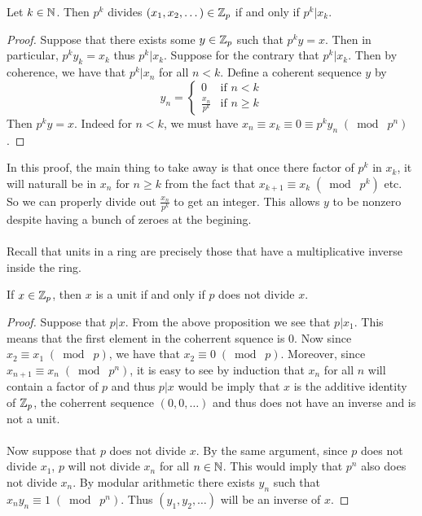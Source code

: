 \documentclass[a4paper]{article}
\begin{document}
\begin{prp}{}{} Let $k\in\mathbb{N}$. Then $p^k$ divides $(x_1,x_2,\dots)\in\mathbb{Z}_p$ if and only if $p^k|x_k$. \tcbline
\begin{proof}
Suppose that there exists some $y\in\mathbb{Z}_p$ such that $p^ky=x$. Then in particular, $p^ky_k=x_k$ thus $p^k|x_k$. Suppose for the contrary that $p^k|x_k$. Then by coherence, we have that $p^k|x_n$ for all $n<k$. Define a coherent sequence $y$ by $$y_n=\begin{cases}
0 & \text{if }n<k\\
\frac{x_n}{p^k} & \text{if }n\geq k
\end{cases}$$
Then $p^ky=x$. Indeed for $n<k$, we must have $x_n\equiv x_k\equiv 0\equiv p^ky_n\;(\bmod\;p^n)$. 
\end{proof}
\end{prp}

In this proof, the main thing to take away is that once there factor of $p^k$ in $x_k$, it will naturall be in $x_n$ for $n\geq k$ from the fact that $x_{k+1}\equiv x_k\;(\bmod\;p^k)$ etc. So we can properly divide out $\frac{x_n}{p^k}$ to get an integer. This allows $y$ to be nonzero despite having a bunch of zeroes at the begining. \\~\\

Recall that units in a ring are precisely those that have a multiplicative inverse inside the ring. 

\begin{lmm}{}{} If $x\in\mathbb{Z}_p$, then $x$ is a unit if and only if $p$ does not divide $x$. \tcbline
\begin{proof}
Suppose that $p|x$. From the above proposition we see that $p|x_1$. This means that the first element in the coherrent squence is $0$. Now since $x_2\equiv x_1\;(\bmod\;p)$, we have that $x_2\equiv 0\;(\bmod\;p)$. Moreover, since $x_{n+1}\equiv x_n\;(\bmod\; p^n)$, it is easy to see by induction that $x_n$ for all $n$ will contain a factor of $p$ and thus $p|x$ would be imply that $x$ is the additive identity of $\mathbb{Z}_p$, the coherrent sequence $(0,0,\dots)$ and thus does not have an inverse and is not a unit. \\~\\
Now suppose that $p$ does not divide $x$. By the same argument, since $p$ does not divide $x_1$, $p$ will not divide $x_n$ for all $n\in\mathbb{N}$. This would imply that $p^n$ also does not divide $x_n$. By modular arithmetic there exists $y_n$ such that $x_ny_n\equiv 1\;(\bmod\;p^n)$. Thus $(y_1,y_2,\dots)$ will be an inverse of $x$. 
\end{proof}
\end{lmm}
\end{document}
